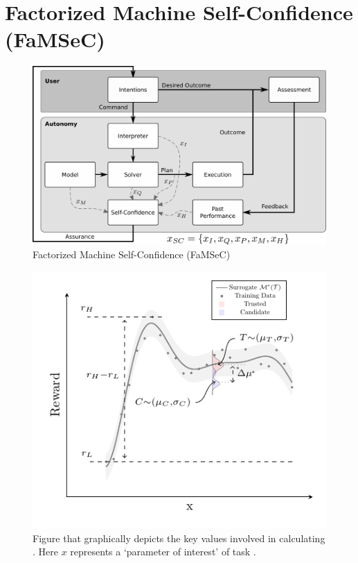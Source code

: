 \section{Factorized Machine Self-Confidence (FaMSeC)}
    \begin{figure}[tbp]
        \centering
        \includegraphics[width=0.55\linewidth]{Figures/FaMSeC.png}
        \caption{Factorized Machine Self-Confidence (FaMSeC)}
        \label{fig:famsec}
    \end{figure}
    
    \begin{figure}[tb]
        \centering
        \includegraphics[width=0.9\linewidth]{Figures/sq_v2_fig}
        \caption{Figure that graphically depicts the key values involved in calculating \xQ. Here $x$ represents a `parameter of interest' of task \task.}
        \label{fig:sq_v2}
    \end{figure}

